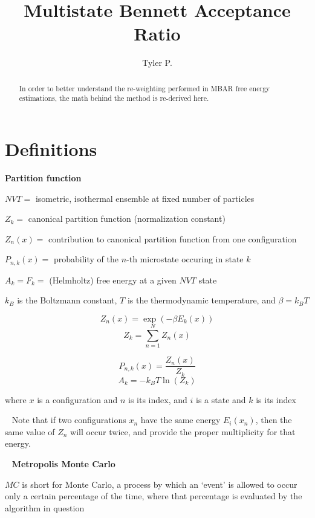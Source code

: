 \documentclass[]{article}
\title{Multistate Bennett Acceptance Ratio}
\author{Tyler P.}
\begin{document}
	
\maketitle

\begin{abstract}
	In order to better understand the re-weighting performed in MBAR free energy estimations, the math behind the method is re-derived here.
\end{abstract}

\section*{Definitions}
\textbf{Partition function}

$NVT =$ isometric, isothermal ensemble at fixed number of particles

$Z_k =$ canonical partition function (normalization constant)

$Z_n(x) =$ contribution to canonical partition function from one configuration

$P_{n,k}(x) =$ probability of the $n$-th microstate occuring in state $k$

$ A_k = F_k =$ (Helmholtz) free energy at a given $NVT$ state

$k_B$ is the Boltzmann constant, $T$ is the thermodynamic temperature, and $\beta = k_B T$

\begin{minipage}[b]{0.5\linewidth}
	\[ Z_n(x) = \exp(-\beta E_k(x)) \]
	\[ Z_k = \sum_{n=1}^{N} Z_n(x) \]
\end{minipage}
\begin{minipage}[b]{0.5\linewidth}
	\[ P_{n,k}(x) = \frac{Z_n(x)}{Z_k} \]
	\[ A_k = -k_B T \ln(Z_k) \]
\end{minipage}

where $x$ is a configuration and $n$ is its index,
and $i$ is a state and $k$ is its index

~\linebreak
Note that if two configurations $x_n$ have the same energy $E_i(x_n)$, then the same value of $Z_n$ will occur twice, and provide the proper multiplicity for that energy.

~\linebreak
\textbf{Metropolis Monte Carlo}\cite{bennett}

$MC$ is short for Monte Carlo, a process by which an `event' is allowed to occur only a certain percentage of the time, where that percentage is evaluated by the algorithm in question
\end{document}
